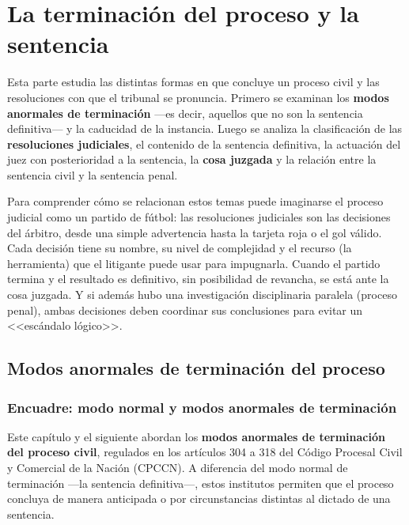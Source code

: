 \documentclass[12pt,oneside]{book}
\begin{document}
\part{La terminación del proceso y la sentencia}
Esta parte estudia las distintas formas en que concluye un proceso civil y las resoluciones con que el tribunal se pronuncia. Primero se examinan los \textbf{modos anormales de terminación} ---es decir, aquellos que no son la sentencia definitiva--- y la caducidad de la instancia. Luego se analiza la clasificación de las \textbf{resoluciones judiciales}, el contenido de la sentencia definitiva, la actuación del juez con posterioridad a la sentencia, la \textbf{cosa juzgada} y la relación entre la sentencia civil y la sentencia penal.


\begin{note}
Para comprender cómo se relacionan estos temas puede imaginarse el proceso judicial como un partido de fútbol: las resoluciones judiciales son las decisiones del árbitro, desde una simple advertencia hasta la tarjeta roja o el gol válido. Cada decisión tiene su nombre, su nivel de complejidad y el recurso (la herramienta) que el litigante puede usar para impugnarla. Cuando el partido termina y el resultado es definitivo, sin posibilidad de revancha, se está ante la cosa juzgada. Y si además hubo una investigación disciplinaria paralela (proceso penal), ambas decisiones deben coordinar sus conclusiones para evitar un <<escándalo lógico>>.
\end{note}

\chapter[Modos anormales de terminación]{Modos anormales de terminación del proceso}\label{cap:modos}

\section{Encuadre: modo normal y modos anormales de terminación}

Este capítulo y el siguiente abordan los \textbf{modos anormales de terminación del proceso civil}, regulados en los artículos 304 a 318 del Código Procesal Civil y Comercial de la Nación (CPCCN). A diferencia del modo normal de terminación ---la sentencia definitiva---, estos institutos permiten que el proceso concluya de manera anticipada o por circunstancias distintas al dictado de una sentencia.
\end{document}
